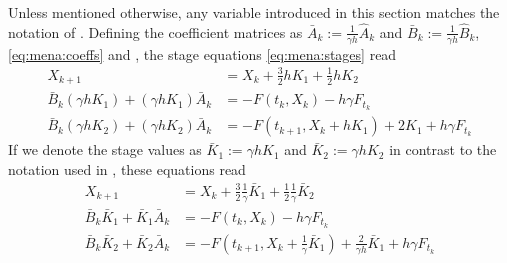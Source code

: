 Unless mentioned otherwise, any variable introduced in this section matches the notation of \cite{MPIMD11-06}.
Defining the coefficient matrices as
$\bar{A}_k := \frac{1}{\gamma h} \hat{A}_k$ and
$\bar{B}_k := \frac{1}{\gamma h} \hat{B}_k$,
\cf \eqref{eq:mena:coeffs} and \cite[7]{MPIMD11-06},
the stage equations \eqref{eq:mena:stages} read
\begin{subequations}
\begin{align}
  X_{k+1} &= X_k + \tfrac{3}{2} h K_1 + \tfrac{1}{2} h K_2 \\
  \bar{B}_k (\gamma h K_1) + (\gamma h K_1) \bar{A}_k &= -F(t_k, X_k) - h\gamma F_{t_k} \\
  \bar{B}_k (\gamma h K_2) + (\gamma h K_2) \bar{A}_k &= -F(t_{k+1}, X_k + hK_1) + 2K_1 + h\gamma F_{t_k}
\end{align}
\end{subequations}
If we denote the stage values as $\bar{K}_1 := \gamma h K_1$ and $\bar{K}_2 := \gamma h K_2$
in contrast to the notation used in \cite{MPIMD11-06},
these equations read
\begin{subequations}\label{eq:mpi11:15}
\begin{align}
  X_{k+1} &= X_k + \tfrac{3}{2} \tfrac{1}{\gamma} \bar{K}_1 + \tfrac{1}{2} \tfrac{1}{\gamma} \bar{K}_2 \\
  \bar{B}_k \bar{K}_1 + \bar{K}_1 \bar{A}_k &= -F(t_k, X_k) - h\gamma F_{t_k} \\
  \bar{B}_k \bar{K}_2 + \bar{K}_2 \bar{A}_k &= -F(t_{k+1}, X_k + \tfrac{1}{\gamma}\bar{K}_1) + \tfrac{2}{\gamma h}\bar{K}_1 + h\gamma F_{t_k}
\end{align}
\end{subequations}

